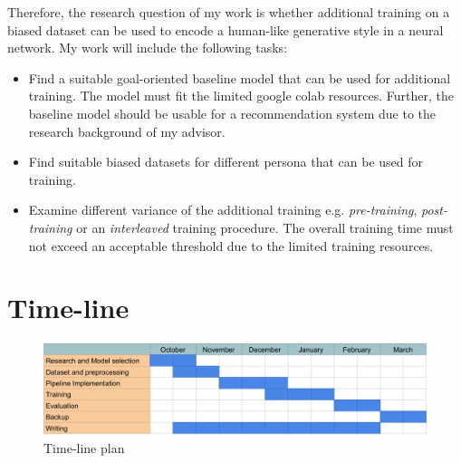 \documentclass[11pt]{article}
\begin{document}
Therefore, the research question of my work is whether additional training on a biased dataset can be used to encode a human-like generative style in a neural network.
My work will include the following tasks:
\begin{itemize}
\item Find a suitable  goal-oriented baseline model that can be used for additional training. The model must fit the limited google colab resources. Further, the baseline model should be usable for a recommendation system due to the research background of my advisor.
\item Find suitable biased datasets for different persona that can be used for training.
\item Examine different variance of the additional training e.g. \textit{pre-training}, \textit{post-training} or an \textit{interleaved} training procedure. The overall training time must not exceed an acceptable threshold due to the limited training resources.
\end{itemize}
\section{Time-line}
\begin{figure}[h]
\centering
\includegraphics[width=\textwidth]{time-table.png}
\caption{Time-line plan}
\end{figure}


\end{document}
